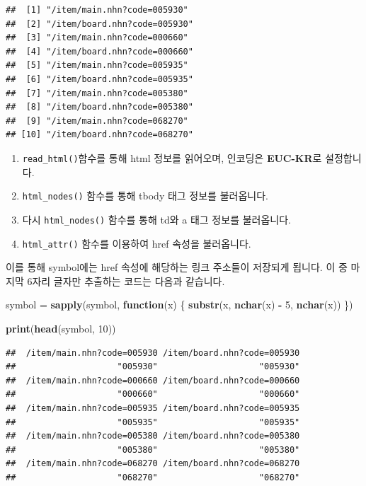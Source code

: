 \documentclass[12pt,]{book}
\newenvironment{Shaded}{\begin{snugshade}}{\end{snugshade}}
\newcommand{\ControlFlowTok}[1]{\textcolor[rgb]{0.13,0.29,0.53}{\textbf{#1}}}
\newcommand{\DecValTok}[1]{\textcolor[rgb]{0.00,0.00,0.81}{#1}}
\newcommand{\KeywordTok}[1]{\textcolor[rgb]{0.13,0.29,0.53}{\textbf{#1}}}
\newcommand{\NormalTok}[1]{#1}
\newcommand{\OperatorTok}[1]{\textcolor[rgb]{0.81,0.36,0.00}{\textbf{#1}}}
\newcommand{\StringTok}[1]{\textcolor[rgb]{0.31,0.60,0.02}{#1}}
\providecommand{\tightlist}{%
  \setlength{\itemsep}{0pt}\setlength{\parskip}{0pt}}
\begin{document}
\begin{verbatim}
##  [1] "/item/main.nhn?code=005930" 
##  [2] "/item/board.nhn?code=005930"
##  [3] "/item/main.nhn?code=000660" 
##  [4] "/item/board.nhn?code=000660"
##  [5] "/item/main.nhn?code=005935" 
##  [6] "/item/board.nhn?code=005935"
##  [7] "/item/main.nhn?code=005380" 
##  [8] "/item/board.nhn?code=005380"
##  [9] "/item/main.nhn?code=068270" 
## [10] "/item/board.nhn?code=068270"
\end{verbatim}

\begin{enumerate}
\def\labelenumi{\arabic{enumi}.}
\tightlist
\item
  \texttt{read\_html()}함수를 통해 html 정보를 읽어오며, 인코딩은 \textbf{EUC-KR}로 설정합니다.
\item
  \texttt{html\_nodes()} 함수를 통해 tbody 태그 정보를 불러옵니다.
\item
  다시 \texttt{html\_nodes()} 함수를 통해 td와 a 태그 정보를 불러옵니다.
\item
  \texttt{html\_attr()} 함수를 이용하여 href 속성을 불러옵니다.
\end{enumerate}

이를 통해 symbol에는 href 속성에 해당하는 링크 주소들이 저장되게 됩니다. 이 중 마지막 6자리 글자만 추출하는 코드는 다음과 같습니다.

\begin{Shaded}
\begin{Highlighting}[]
\NormalTok{symbol =}\StringTok{ }\KeywordTok{sapply}\NormalTok{(symbol, }\ControlFlowTok{function}\NormalTok{(x) \{}
        \KeywordTok{substr}\NormalTok{(x, }\KeywordTok{nchar}\NormalTok{(x) }\OperatorTok{-}\StringTok{ }\DecValTok{5}\NormalTok{, }\KeywordTok{nchar}\NormalTok{(x)) }
\NormalTok{      \})}

\KeywordTok{print}\NormalTok{(}\KeywordTok{head}\NormalTok{(symbol, }\DecValTok{10}\NormalTok{))}
\end{Highlighting}
\end{Shaded}

\begin{verbatim}
##  /item/main.nhn?code=005930 /item/board.nhn?code=005930 
##                    "005930"                    "005930" 
##  /item/main.nhn?code=000660 /item/board.nhn?code=000660 
##                    "000660"                    "000660" 
##  /item/main.nhn?code=005935 /item/board.nhn?code=005935 
##                    "005935"                    "005935" 
##  /item/main.nhn?code=005380 /item/board.nhn?code=005380 
##                    "005380"                    "005380" 
##  /item/main.nhn?code=068270 /item/board.nhn?code=068270 
##                    "068270"                    "068270"
\end{verbatim}
\end{document}
